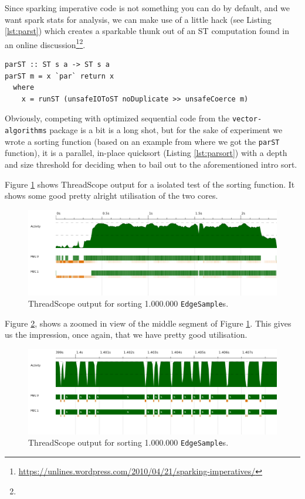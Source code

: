\documentclass[12pt, a4paper]{article}
\begin{document}
Since sparking imperative code is not something you can do by default, and we want spark stats for
analysis, we can make use of a little hack (see Listing \ref{lst:parst}) which creates a sparkable
 thunk out of an ST computation found in an online discussion\footnote{\label{note1}\url{https://unlines.wordpress.com/2010/04/21/sparking-imperatives/}}\footnote{}.
\begin{lstlisting}[label={lst:parst}, caption={\texttt{parST}}]
parST :: ST s a -> ST s a
parST m = x `par` return x
  where
    x = runST (unsafeIOToST noDuplicate >> unsafeCoerce m)
\end{lstlisting}
Obviously, competing with optimized sequential code from the \texttt{vector-algorithms} package is a
 bit is a long shot, but for the sake of experiment we wrote a sorting function (based on an example from where we got the \texttt{parST} function),
 it is a parallel, in-place quicksort (Listing \ref{lst:parsort}) with a depth and size threshold for deciding when to bail out to the aforementioned intro sort.

 Figure \ref{fig:sorting-thread} shows ThreadScope output for a isolated test of the sorting function.
 It shows some good pretty alright utilisation of the two cores.

 \begin{figure}[h!]
  \centering
  \includegraphics[width=0.85\linewidth]{../threadscope/sorting/sorting-final}
  \caption{ThreadScope output for sorting 1.000.000 \texttt{EdgeSample}s.}
  \label{fig:sorting-thread}
\end{figure}

Figure \ref{fig:sorting-thread-zoomed}, shows a zoomed in view of the middle segment of Figure \ref{fig:sorting-thread}.
This gives us the impression, once again, that we have pretty good utilisation.

 \begin{figure}[h!]
  \centering
  \includegraphics[width=0.85\linewidth]{../threadscope/sorting/sorting-final-zoom}
  \caption{ThreadScope output for sorting 1.000.000 \texttt{EdgeSample}s.}
  \label{fig:sorting-thread-zoomed}
\end{figure}
\end{document}
